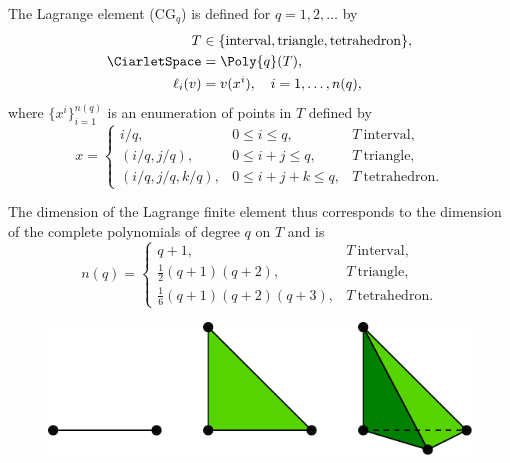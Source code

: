 \begin{definition}
  The Lagrange element ($\mathrm{CG}_q$) is defined for $q = 1, 2,
  \dots$ by
  \begin{align}
    T &\in \{ \mathrm{interval}{},
              \mathrm{triangle}{},
              \mathrm{tetrahedron}{}\}, \\
    \CiarletSpace &= \Poly{q}(T), \\
    \ell_i(v) &= v(x^i), \quad i = 1, \dots, n(q),
  \end{align}
  where $\{ x^i \}_{i=1}^{n(q)}$ is an enumeration of points in $T$
  defined by
  \begin{equation}
    x =
    \left \{
    \begin{array}{lll}
      i/q,             & 0 \leqslant i \leqslant q,         & T~\mathrm{interval}{}, \\
      (i/q, j/q),      & 0 \leqslant i + j \leqslant q,     & T~\mathrm{triangle}{}, \\
      (i/q, j/q, k/q), & 0 \leqslant i + j + k \leqslant q, & T~\mathrm{tetrahedron}{}.
    \end{array}
    \right.
  \end{equation}
\end{definition}
The dimension of the Lagrange finite element thus corresponds to the
dimension of the complete polynomials of degree $q$ on $T$ and is
\begin{equation}
  n(q) =
    \left \{
    \begin{array}{ll}
      q + 1, & T~\mathrm{interval}, \\
      \frac{1}{2} (q + 1)(q + 2), & T~\mathrm{triangle}, \\
      \frac{1}{6} (q + 1)(q + 2)(q + 3), & T~\mathrm{tetrahedron}.
    \end{array}
    \right.
\end{equation}

\begin{figure}
  {\includegraphics[width=\fullfig]{chapters/kirby-6/pdf/P1_1d2d3d.pdf}}
\end{figure}


